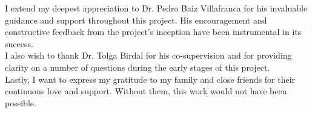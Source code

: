 \documentclass[12pt,twoside]{report}
\begin{document}
I extend my deepest appreciation to Dr. Pedro Baiz Villafranca for his invaluable guidance and support throughout this project. His encouragement and constructive feedback from the project's inception have been instrumental in its success.\\

I also wish to thank Dr. Tolga Birdal for his co-supervision and for providing clarity on a number of questions during the early stages of this project.\\

Lastly, I want to express my gratitude to my family and close friends for their continuous love and support. Without them, this work would not have been possible.

\tableofcontents 

\newpage

\setcounter{page}{1}



















\end{document}
